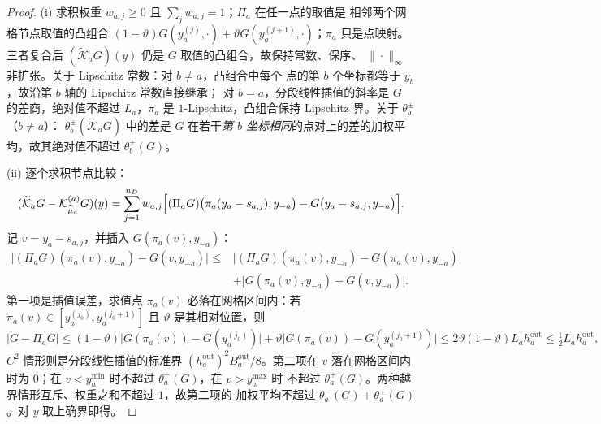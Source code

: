 \documentclass[a4paper,11pt]{article}
\theoremstyle{definition}
\newcommand{\1}{\mathbf 1}
\begin{document}
\begin{proof}
(i) 求积权重 $w_{a,j}\ge0$ 且 $\sum_jw_{a,j}=1$；$\Pi_a$ 在任一点的取值是
相邻两个网格节点取值的凸组合 $(1-\vartheta)G(y_a^{(j)},\cdot)
+\vartheta G(y_a^{(j+1)},\cdot)$；$\pi_a$ 只是点映射。三者复合后
$(\widetilde{\mathcal K}_aG)(y)$ 仍是 $G$ 取值的凸组合，故保持常数、保序、
$\|\cdot\|_\infty$ 非扩张。关于 Lipschitz 常数：对 $b\ne a$，凸组合中每个
点的第 $b$ 个坐标都等于 $y_b$，故沿第 $b$ 轴的 Lipschitz 常数直接继承；
对 $b=a$，分段线性插值的斜率是 $G$ 的差商，绝对值不超过 $L_a$，$\pi_a$ 是
$1$-Lipschitz，凸组合保持 Lipschitz 界。关于 $\theta_b^\pm$（$b\ne a$）：
$\theta_b^\pm(\widetilde{\mathcal K}_aG)$ 中的差是 $G$ 在若干\emph{第 $b$
坐标相同}的点对上的差的加权平均，故其绝对值不超过
$\theta_b^\pm(G)$。

(ii) 逐个求积节点比较：
\[
(\widetilde{\mathcal K}_aG-\mathcal K_{\widehat\mu_a}^{(a)}G)(y)
=
\sum_{j=1}^{n_D}w_{a,j}
\Bigl[(\Pi_aG)\bigl(\pi_a(y_a-s_{a,j}),y_{-a}\bigr)
-G\bigl(y_a-s_{a,j},y_{-a}\bigr)\Bigr].
\]
记 $v=y_a-s_{a,j}$，并插入 $G(\pi_a(v),y_{-a})$：
\[
\begin{aligned}
\bigl|(\Pi_aG)(\pi_a(v),y_{-a})-G(v,y_{-a})\bigr|
\le{}&
\bigl|(\Pi_aG)(\pi_a(v),y_{-a})-G(\pi_a(v),y_{-a})\bigr|\\
&+
\bigl|G(\pi_a(v),y_{-a})-G(v,y_{-a})\bigr|.
\end{aligned}
\]
第一项是插值误差，求值点 $\pi_a(v)$ 必落在网格区间内：若
$\pi_a(v)\in[y_a^{(j_0)},y_a^{(j_0+1)}]$ 且 $\vartheta$ 是其相对位置，则
\[
\bigl|G-\Pi_aG\bigr|
\le
(1-\vartheta)\bigl|G(\pi_a(v))-G(y_a^{(j_0)})\bigr|
+\vartheta\bigl|G(\pi_a(v))-G(y_a^{(j_0+1)})\bigr|
\le
2\vartheta(1-\vartheta)L_ah_a^{\mathrm{out}}
\le
\tfrac12L_ah_a^{\mathrm{out}},
\]
$C^2$ 情形则是分段线性插值的标准界
$(h_a^{\mathrm{out}})^2B_a^{\mathrm{out}}/8$。第二项在 $v$ 落在网格区间内
时为 $0$；在 $v<y_a^{\min}$ 时不超过 $\theta_a^-(G)$，在 $v>y_a^{\max}$ 时
不超过 $\theta_a^+(G)$。两种越界情形互斥、权重之和不超过 $1$，故第二项的
加权平均不超过 $\theta_a^-(G)+\theta_a^+(G)$。对 $y$ 取上确界即得。
\end{proof}
\end{document}
